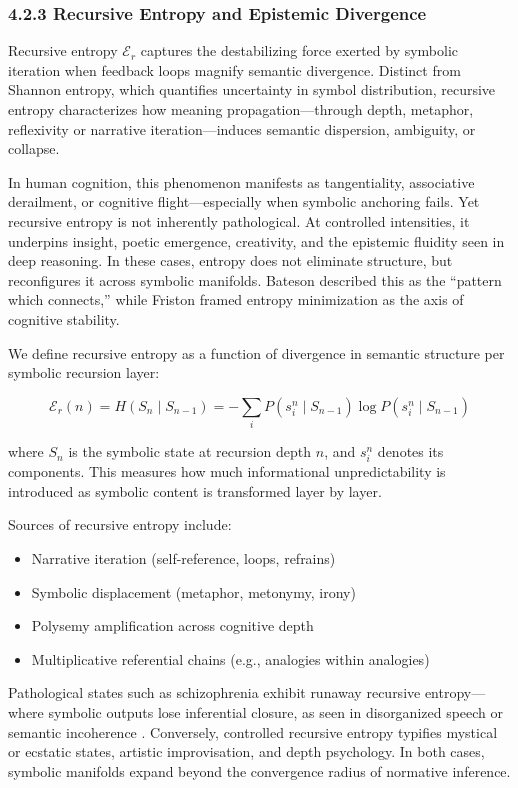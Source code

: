 \subsubsection*{4.2.3 Recursive Entropy and Epistemic Divergence}

Recursive entropy $\mathcal{E}_r$ captures the destabilizing force exerted by symbolic iteration when feedback loops magnify semantic divergence. Distinct from Shannon entropy, which quantifies uncertainty in symbol distribution, recursive entropy characterizes how meaning propagation—through depth, metaphor, reflexivity or narrative iteration—induces semantic dispersion, ambiguity, or collapse.

In human cognition, this phenomenon manifests as tangentiality, associative derailment, or cognitive flight—especially when symbolic anchoring fails. Yet recursive entropy is not inherently pathological. At controlled intensities, it underpins insight, poetic emergence, creativity, and the epistemic fluidity seen in deep reasoning. In these cases, entropy does not eliminate structure, but reconfigures it across symbolic manifolds. Bateson \cite{bateson1979mind} described this as the “pattern which connects,” while Friston \cite{friston2010free} framed entropy minimization as the axis of cognitive stability.

We define recursive entropy as a function of divergence in semantic structure per symbolic recursion layer:

\[
\mathcal{E}_r(n) = H(S_n \mid S_{n-1}) = - \sum_i P(s_i^n \mid S_{n-1}) \log P(s_i^n \mid S_{n-1})
\]

where $S_n$ is the symbolic state at recursion depth $n$, and $s_i^n$ denotes its components. This measures how much informational unpredictability is introduced as symbolic content is transformed layer by layer.

Sources of recursive entropy include:
\begin{itemize}
\item Narrative iteration (self-reference, loops, refrains)
\item Symbolic displacement (metaphor, metonymy, irony)
\item Polysemy amplification across cognitive depth
\item Multiplicative referential chains (e.g., analogies within analogies)
\end{itemize}

Pathological states such as schizophrenia exhibit runaway recursive entropy—where symbolic outputs lose inferential closure, as seen in disorganized speech or semantic incoherence \cite{elvevag2007lsa}. Conversely, controlled recursive entropy typifies mystical or ecstatic states, artistic improvisation, and depth psychology. In both cases, symbolic manifolds expand beyond the convergence radius of normative inference.

